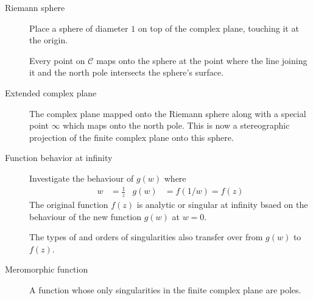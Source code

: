 \begin{description}
    \item[Riemann sphere] Place a sphere of diameter $ 1 $ on top of the complex plane,
        touching it at the origin. \par
        Every point on $ \mathcal{C} $ maps onto the sphere at the point where the line
        joining it and the north pole intersects the sphere's surface.
        \begin{figure}[H]
            \centering
        \end{figure}

    \item[Extended complex plane] The complex plane mapped onto the Riemann sphere
        along with a special point $ \infty $ which maps onto the north pole. This
        is now a stereographic projection of the finite complex plane onto this sphere.

    \item[Function behavior at infinity] Investigate the behaviour of $ g(w) $ where
        \begin{align}
            w    & = \frac{1}{z}   &
            g(w) & = f(1/w) = f(z)
        \end{align}
        The original function $ f(z) $ is analytic or singular at infinity bsaed on the
        behaviour of the new function $ g(w) $ at $ w = 0 $. \par
        The types of and orders of singularities also transfer over from $ g(w) $ to
        $ f(z) $.


    \item[Meromorphic function] A function whose only singularities in the finite
        complex plane are poles.
\end{description}

